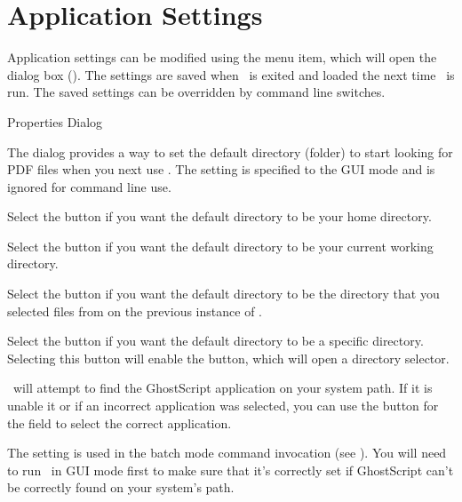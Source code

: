 \chapter{Application Settings}
\label{sec:settings}

Application settings can be modified using the
 menu item, which will open the
 dialog box ().
The settings are saved when \Jmakepdfx\ is exited and loaded the
next time \Jmakepdfx\ is run. The saved settings can be overridden
by command line switches.

 {%
 }
 {Properties Dialog}


The  dialog provides a way to set the default
directory (folder) to start looking for PDF files when you next use
\Jmakepdfx. The  setting is
specified to the \gls{GUI} mode and is ignored for command line use.

Select the  button if you want the
default directory to be your home directory.

Select the  button if you want the
default directory to be your current working directory.

Select the  button if you want the
default directory to be the directory that you selected files from
on the previous instance of \Jmakepdfx.

Select the  button if you want the
default directory to be a specific directory. Selecting this button
will enable the  button, which will open a
directory selector.

\Jmakepdfx\ will attempt to find the GhostScript application on your
system path. If it is unable it or if an incorrect application was
selected, you can use the  button for the 
 field to select the correct application.

\begin{information}
The  setting is used in the batch mode
command invocation (see ). You will need to
run \Jmakepdfx\ in \gls{GUI} mode first to make sure that it's
correctly set if GhostScript can't be correctly found on your
system's path.
\end{information}

